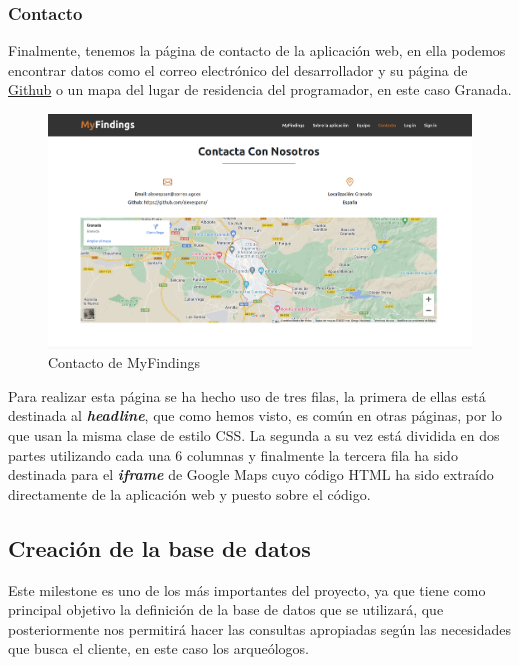     \subsubsection{Contacto}
    Finalmente, tenemos la página de contacto de la aplicación web, en ella podemos
    encontrar datos como el correo electrónico del desarrollador y su página de
    \href{https://github.com/alexespana/}{Github} o un mapa del lugar de residencia del
    programador, en este caso Granada.\\

        \begin{figure}[H]
            \centering
            \includegraphics[scale=0.20]{imagenes/contact.png}
            \caption{Contacto de MyFindings}
            \label{fig:contact}
        \end{figure}

    Para realizar esta página se ha hecho uso de tres filas, la primera de ellas
    está destinada al \textbf{\textit{headline}}, que como hemos visto, es común en otras
    páginas, por lo que usan la misma clase de estilo CSS. La segunda a su vez está
    dividida en dos partes utilizando cada una 6 columnas y finalmente la tercera fila ha
    sido destinada para el \textbf{\textit{iframe}} de Google Maps cuyo código HTML ha sido
    extraído directamente de la aplicación web y puesto sobre el código.

\subsection{Creación de la base de datos}
Este milestone es uno de los más importantes del proyecto, ya que tiene como principal objetivo
la definición de la base de datos que se utilizará, que posteriormente nos permitirá hacer las
consultas apropiadas según las necesidades que busca el cliente, en este caso los arqueólogos.\\

